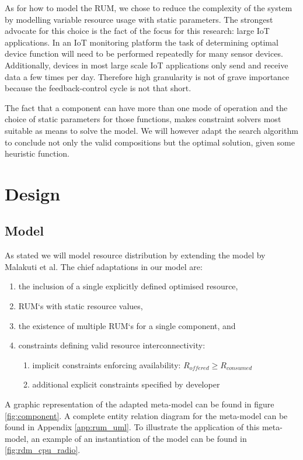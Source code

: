 As for how to model the RUM, we chose to reduce the complexity of the system by modelling variable resource usage with static parameters. The strongest advocate for this choice is the fact of the focus for this research: large IoT applications. In an IoT monitoring platform the task of determining optimal device function will need to be performed repeatedly for many sensor devices. Additionally, devices in most large scale IoT applications  only send and receive data a few times per day\cite{refs over size zoeken}. Therefore high granularity is not of grave importance because the feedback-control cycle is not that short. 

The fact that a component can have more than one mode of operation and the choice of static parameters for those functions, makes constraint solvers most suitable as means to solve the model. We will however adapt the search algorithm to conclude not only the valid compositions but the optimal solution, given some heuristic function.

\section{Design}
\subsection{Model}
As stated we will model resource distribution by extending the model by Malakuti et al\cite{steven_te_brinke}. The chief adaptations in our model are:
\begin{enumerate}
\nospace
\item the inclusion of a single explicitly defined optimised resource,
\item RUM`s with static resource values,
\item the existence of multiple RUM`s for a single component, and
\item constraints defining valid resource interconnectivity:
\begin{enumerate}
\nospace
\item implicit constraints enforcing availability: $R_{offered} \geq R_{consumed}$
\item additional explicit constraints specified by developer
\end{enumerate}
\end{enumerate}

A graphic representation of the adapted meta-model can be found in figure \ref{fig:component}. A complete entity relation diagram for the meta-model can be found in Appendix \ref{app:rum_uml}. To illustrate the application of this meta-model, an example of an instantiation of the model can be found in \ref{fig:rdm_cpu_radio}. 

